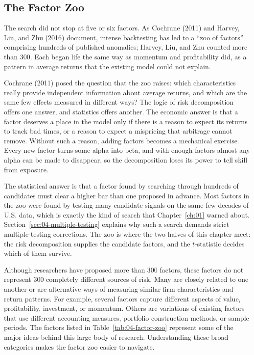 \subsection{The Factor Zoo}
\label{sec:04-zoo}
The search did not stop at five or six factors. As Cochrane (2011) and Harvey, Liu, and Zhu (2016) document, intense backtesting has led to a ``zoo of factors'' comprising hundreds of published anomalies; Harvey, Liu, and Zhu counted more than 300. Each began life the same way as momentum and profitability did, as a pattern in average returns that the existing model could not explain.

Cochrane (2011) posed the question that the zoo raises: which characteristics really provide independent information about average returns, and which are the same few effects measured in different ways? The logic of risk decomposition offers one answer, and statistics offers another. The economic answer is that a factor deserves a place in the model only if there is a reason to expect its returns to track bad times, or a reason to expect a mispricing that arbitrage cannot remove. Without such a reason, adding factors becomes a mechanical exercise. Every new factor turns some alpha into beta, and with enough factors almost any alpha can be made to disappear, so the decomposition loses its power to tell skill from exposure.

The statistical answer is that a factor found by searching through hundreds of candidates must clear a higher bar than one proposed in advance. Most factors in the zoo were found by testing many candidate signals on the same few decades of U.S. data, which is exactly the kind of search that Chapter~\ref{ch:01} warned about. Section~\ref{sec:04-multiple-testing} explains why such a search demands strict multiple-testing corrections. The zoo is where the two halves of this chapter meet: the risk decomposition supplies the candidate factors, and the $t$-statistic decides which of them survive.

Although researchers have proposed more than 300 factors, these
factors do not represent 300 completely different sources of risk.
Many are closely related to one another or are alternative ways of
measuring similar firm characteristics and return patterns. For
example, several factors capture different aspects of value,
profitability, investment, or momentum. Others are variations of
existing factors that use different accounting measures, portfolio
construction methods, or sample periods. The factors listed in
Table~\ref{tab:04-factor-zoo} represent some of the major ideas
behind this large body of research. Understanding these broad
categories makes the factor zoo easier to navigate.

